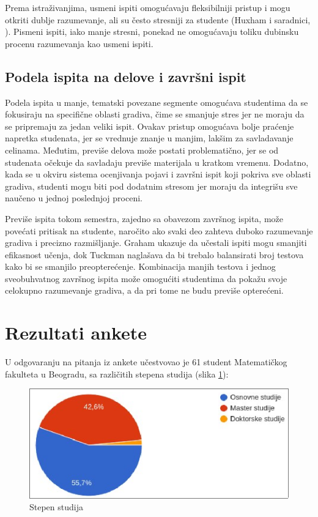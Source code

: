\documentclass[a4paper]{article}
\begin{document}
Prema istraživanjima, usmeni ispiti omogućavaju fleksibilniji pristup i mogu otkriti dublje razumevanje, ali su često stresniji za studente (Huxham i saradnici, \cite{huxham2010oral}). Pismeni ispiti, iako manje stresni, ponekad ne omogućavaju toliku dubinsku procenu razumevanja kao usmeni ispiti.

\subsection{Podela ispita na delove i završni ispit}

Podela ispita u manje, tematski povezane segmente omogućava studentima da se fokusiraju na specifične oblasti gradiva, čime se smanjuje stres jer ne moraju da se pripremaju za jedan veliki ispit. Ovakav pristup omogućava bolje praćenje napretka studenata, jer se vrednuje znanje u manjim, lakšim za savladavanje celinama. Međutim, previše delova može postati problematično, jer se od studenata očekuje da savladaju previše materijala u kratkom vremenu. Dodatno, kada se u okviru sistema ocenjivanja pojavi i završni ispit koji pokriva sve oblasti gradiva, studenti mogu biti pod dodatnim stresom jer moraju da integrišu sve naučeno u jednoj poslednjoj proceni.

Previše ispita tokom semestra, zajedno sa obavezom završnog ispita, može povećati pritisak na studente, naročito ako svaki deo zahteva duboko razumevanje gradiva i precizno razmišljanje. Graham \cite{graham1999practice} ukazuje da učestali ispiti mogu smanjiti efikasnost učenja, dok Tuckman \cite{tuckman1998benefits} naglašava da bi trebalo balansirati broj testova kako bi se smanjilo preopterećenje. Kombinacija manjih testova i jednog sveobuhvatnog završnog ispita može omogućiti studentima da pokažu svoje celokupno razumevanje gradiva, a da pri tome ne budu previše opterećeni.

\section{Rezultati ankete}

U odgovaranju na pitanja iz ankete učestvovao je 61 student Matematičkog fakulteta u Beogradu, sa različitih stepena studija (slika \ref{fig:stepen_studija}):

\begin{figure}[h!]
\begin{center}
\includegraphics[scale=0.4]{data_rezultati/stepen_studija_pie.png}
\end{center}
\caption{Stepen studija}
\label{fig:stepen_studija}
\end{figure}
\end{document}
